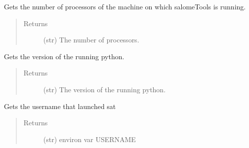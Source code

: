 \documentclass[a4paper,10pt,english]{sphinxmanual}
\begin{document}

\begin{fulllineitems}
\label{\detokenize{apidoc_src/src:src.architecture.get_nb_proc}}
Gets the number of processors of the machine 
on which salomeTools is running.
\begin{quote}\begin{description}
\item[{Returns}] \leavevmode
(str) The number of processors.

\end{description}\end{quote}

\end{fulllineitems}


\begin{fulllineitems}
\label{\detokenize{apidoc_src/src:src.architecture.get_python_version}}
Gets the version of the running python.
\begin{quote}\begin{description}
\item[{Returns}] \leavevmode
(str) The version of the running python.

\end{description}\end{quote}

\end{fulllineitems}


\begin{fulllineitems}
\label{\detokenize{apidoc_src/src:src.architecture.get_user}}
Gets the username that launched sat
\begin{quote}\begin{description}
\item[{Returns}] \leavevmode
(str) environ var USERNAME

\end{description}\end{quote}

\end{fulllineitems}
\end{document}
